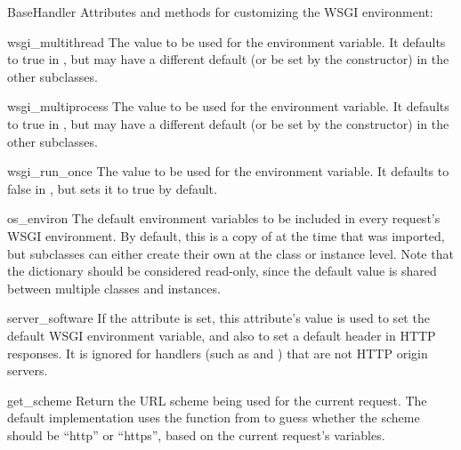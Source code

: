 \begin{classdesc}{BaseHandler}{}
Attributes and methods for customizing the WSGI environment:

\begin{memberdesc}{wsgi_multithread}
The value to be used for the  environment
variable.  It defaults to true in , but may have
a different default (or be set by the constructor) in the other
subclasses.
\end{memberdesc}

\begin{memberdesc}{wsgi_multiprocess}
The value to be used for the  environment
variable.  It defaults to true in , but may have
a different default (or be set by the constructor) in the other
subclasses.
\end{memberdesc}

\begin{memberdesc}{wsgi_run_once}
The value to be used for the  environment
variable.  It defaults to false in , but
 sets it to true by default.
\end{memberdesc}

\begin{memberdesc}{os_environ}
The default environment variables to be included in every request's
WSGI environment.  By default, this is a copy of  at the
time that  was imported, but subclasses can
either create their own at the class or instance level.  Note that the
dictionary should be considered read-only, since the default value is
shared between multiple classes and instances.
\end{memberdesc}

\begin{memberdesc}{server_software}
If the  attribute is set, this attribute's value
is used to set the default  WSGI environment
variable, and also to set a default  header in HTTP
responses.  It is ignored for handlers (such as 
and ) that are not HTTP origin servers.
\end{memberdesc}



\begin{methoddesc}{get_scheme}{}
Return the URL scheme being used for the current request.  The default
implementation uses the  function from
 to guess whether the scheme should be ``http'' or
``https'', based on the current request's  variables.
\end{methoddesc}


\end{classdesc}
